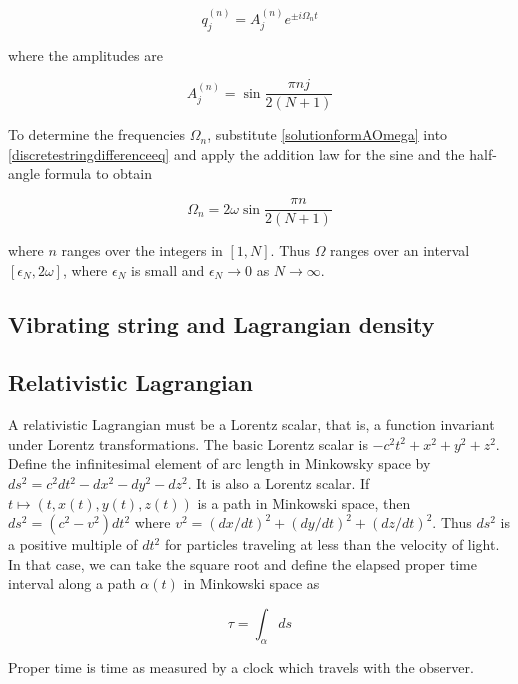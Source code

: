 \begin{equation}
\label{solutionformAOmega}
q_j^{(n)} = A_j^{(n)} e^{\pm i \Omega_n t}
\end{equation}

where the amplitudes are

\begin{equation}
A_j^{(n)} = \sin \frac{\pi n j}{2(N+1)}
\end{equation}

To determine the frequencies $\Omega_n$, substitute  \eqref{solutionformAOmega} into \eqref{discretestringdifferenceeq} and apply the addition law for the sine and the half-angle formula to obtain

\begin{equation}
\Omega_n = 2\omega\sin \frac{\pi n}{2(N+1)}
\end{equation}

where $n$ ranges over the integers in $[1,N]$.  Thus $\Omega$  ranges over an interval $[\epsilon_N, 2\omega]$, where $\epsilon_N$ is small and $\epsilon_N \to 0$ as $N \to \infty$.

\subsection{Vibrating string and Lagrangian density}


\subsection{Relativistic Lagrangian}

A relativistic Lagrangian must be  a Lorentz scalar, that is, a function invariant under Lorentz transformations.  The basic Lorentz scalar is $-c^2 t^2 +x^2 + y^2 + z^2$.  Define the infinitesimal element of arc length in Minkowsky space  by $ds^2 = c^2 dt^2 - dx^2 - dy^2 - dz^2$.  It is also a Lorentz scalar. If $t \mapsto (t,x(t), y(t), z(t))$ is a path in Minkowski space, then $ds^2 = (c^2 - v^2)dt^2$ where
$v^2 = (dx/dt)^2 + (dy/dt)^2 + (dz/dt)^2$. Thus $ds^2$ is a positive multiple of $dt^2$ for particles traveling at less than the velocity of light.  In that case, we can take the square root and define the elapsed proper time interval along a path $\alpha(t)$ in Minkowski space as

\begin{equation}
\label{relativisticaction}
  \tau = \int_\alpha ds
\end{equation}

Proper time is time as measured by a clock which travels with the observer.

